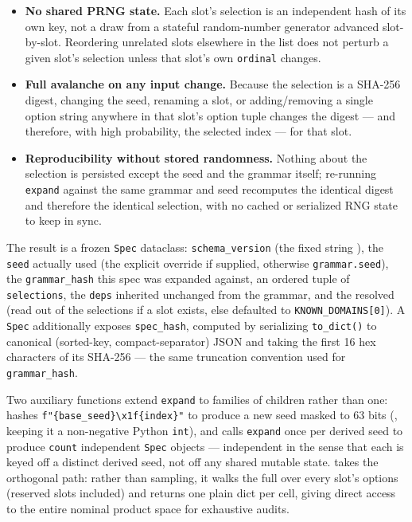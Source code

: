 \documentclass[
]{article}
\providecommand{\tightlist}{%
  \setlength{\itemsep}{0pt}\setlength{\parskip}{0pt}}
\begin{document}
\begin{itemize}
\tightlist
\item
  \textbf{No shared PRNG state.} Each slot's selection is an independent
  hash of its own key, not a draw from a stateful random-number
  generator advanced slot-by-slot. Reordering unrelated slots elsewhere
  in the list does not perturb a given slot's selection unless that
  slot's own \texttt{ordinal} changes.
\item
  \textbf{Full avalanche on any input change.} Because the selection is
  a SHA-256 digest, changing the seed, renaming a slot, or
  adding/removing a single option string anywhere in that slot's option
  tuple changes the digest --- and therefore, with high probability, the
  selected index --- for that slot.
\item
  \textbf{Reproducibility without stored randomness.} Nothing about the
  selection is persisted except the seed and the grammar itself;
  re-running \texttt{expand} against the same grammar and seed
  recomputes the identical digest and therefore the identical selection,
  with no cached or serialized RNG state to keep in sync.
\end{itemize}

The result is a frozen \texttt{Spec} dataclass: \texttt{schema\_version}
(the fixed string ), the \texttt{seed}
actually used (the explicit override if supplied, otherwise
\texttt{grammar.seed}), the \texttt{grammar\_hash} this spec was
expanded against, an ordered tuple of
 \texttt{selections}, the
\texttt{deps} inherited unchanged from the grammar, and the resolved
 (read out of the selections if a
 slot exists, else defaulted to
\texttt{KNOWN\_DOMAINS{[}0{]}}). A \texttt{Spec} additionally exposes
\texttt{spec\_hash}, computed by serializing \texttt{to\_dict()} to
canonical (sorted-key, compact-separator) JSON and taking the first 16
hex characters of its SHA-256 --- the same truncation convention used
for \texttt{grammar\_hash}.

Two auxiliary functions extend \texttt{expand} to families of children
rather than one:  hashes
\texttt{f"\{base\_seed\}\textbackslash{}x1f\{index\}"} to produce a new
seed masked to 63 bits (, keeping it a
non-negative Python \texttt{int}), and
 calls \texttt{expand}
once per derived seed to produce \texttt{count} independent
\texttt{Spec} objects --- independent in the sense that each is keyed
off a distinct derived seed, not off any shared mutable state.
 takes the orthogonal path: rather than
sampling, it walks the full  over every slot's
options (reserved slots included) and returns one plain dict per cell,
giving direct access to the entire nominal product space for exhaustive
audits.
\end{document}
